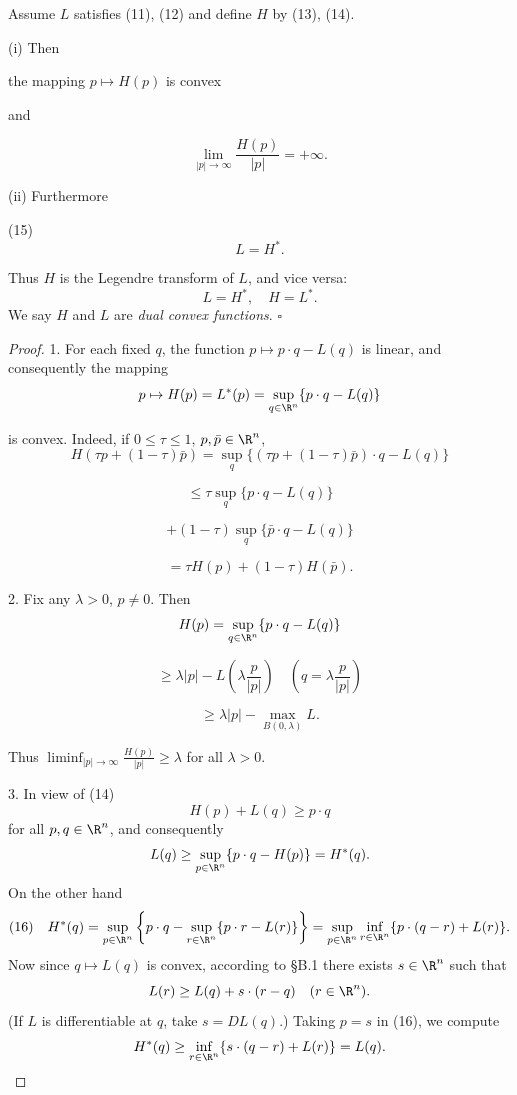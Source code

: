 \begin{theorem}
\label{thm:convex-duality-hamiltonian-lagrangian}
Assume $L$ satisfies (11), (12) and define $H$ by (13), (14).

(i) Then

the mapping $p \mapsto H(p)$ is convex

and

$$\lim_{|p| \to \infty} \frac{H(p)}{|p|} = +\infty.$$

(ii) Furthermore

(15) $$L = H^*.$$
\end{theorem}

\begin{remark}
\label{rem:dual-convex-functions}
Thus $H$ is the Legendre transform of $L$, and vice versa:
$$L = H^*, \quad H = L^*.$$
We say $H$ and $L$ are \textit{dual convex functions}. $\square$
\end{remark}

\begin{proof}
1. For each fixed $q$, the function $p \mapsto p \cdot q - L(q)$ is linear, and consequently the mapping
$$p \mapsto H(p) = L^*(p) = \sup_{q \in \R^n} \{p \cdot q - L(q)\}$$

is convex. Indeed, if $0 \leq \tau \leq 1$, $p, \bar{p} \in \R^n$,
$$H(\tau p + (1-\tau)\bar{p}) = \sup_q \{(\tau p + (1-\tau)\bar{p}) \cdot q - L(q)\}$$

$$\leq \tau \sup_q \{p \cdot q - L(q)\}$$

$$+ (1-\tau) \sup_q \{\bar{p} \cdot q - L(q)\}$$

$$= \tau H(p) + (1-\tau) H(\bar{p}).$$

2. Fix any $\lambda > 0$, $p \neq 0$. Then
$$H(p) = \sup_{q \in \R^n} \{p \cdot q - L(q)\}$$

$$\geq \lambda |p| - L\left(\lambda \frac{p}{|p|}\right) \quad \left(q = \lambda \frac{p}{|p|}\right)$$

$$\geq \lambda |p| - \max_{B(0,\lambda)} L.$$

Thus $\liminf_{|p| \to \infty} \frac{H(p)}{|p|} \geq \lambda$ for all $\lambda > 0$.

3. In view of (14)
$$H(p) + L(q) \geq p \cdot q$$
for all $p,q \in \R^n$, and consequently
$$L(q) \geq \sup_{p \in \R^n} \{p \cdot q - H(p)\} = H^*(q).$$
On the other hand
$$(16) \quad H^*(q) = \sup_{p \in \R^n} \left\{p \cdot q - \sup_{r \in \R^n}\{p \cdot r - L(r)\}\right\} = \sup_{p \in \R^n} \inf_{r \in \R^n} \{p \cdot (q-r) + L(r)\}.$$
Now since $q \mapsto L(q)$ is convex, according to \S B.1 there exists $s \in \R^n$ such that
$$L(r) \geq L(q) + s \cdot (r-q) \quad (r \in \R^n).$$
(If $L$ is differentiable at $q$, take $s = DL(q)$.) Taking $p = s$ in (16), we compute
$$H^*(q) \geq \inf_{r \in \R^n} \{s \cdot (q-r) + L(r)\} = L(q).$$
\end{proof}

